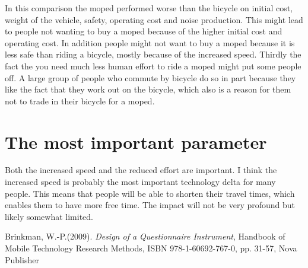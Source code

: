 \documentclass[a4paper]{article}
\begin{document}
In this comparison the moped performed worse than the bicycle on initial cost, weight of the vehicle, safety, operating cost and noise production. This might lead to people not wanting to buy a moped because of the higher initial cost and operating cost. In addition people might not want to buy a moped because it is less safe than riding a bicycle, mostly because of the increased speed. Thirdly the fact the you need much less human effort to ride a moped might put some people off. A large group of people who commute by bicycle do so in part because they like the fact that they work out on the bicycle, which also is a reason for them not to trade in their bicycle for a moped.

\section{The most important parameter}
\label{sec:important}

Both the increased speed and the reduced effort are important. I think the increased speed is probably the most important technology delta for many people. This means that people will be able to shorten their travel times, which enables them to have more free time. The impact will not be very profound but likely somewhat limited.

\begin{thebibliography}{9}
  Brinkman, W.-P.(2009). \emph{Design of a Questionnaire Instrument}, Handbook of Mobile Technology Research Methods, ISBN 978-1-60692-767-0, pp. 31-57, Nova Publisher

\end{thebibliography}
\end{document}
